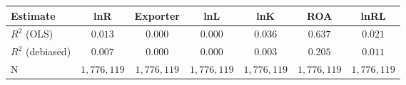 \begin{tabular}{l*{6}{c}}
\hline\hline
 Estimate & lnR & Exporter & lnL & lnK & ROA & lnRL \\
\hline
\addlinespace $ R^2$ (OLS) & $0.013$ & $0.000$ & $0.000$ & $0.036$ & $0.637$ & $0.021$ \\
$ R^2$ (debiased) & $0.007$ & $0.000$ & $0.000$ & $0.003$ & $0.205$ & $0.011$ \\
N & $1,776,119$ & $1,776,119$ & $1,776,119$ & $1,776,119$ & $1,776,119$ & $1,776,119$ \\
\hline\hline
\end{tabular}
